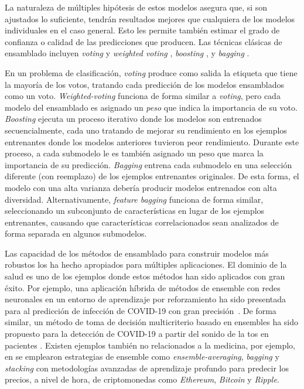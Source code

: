 La naturaleza de múltiples hipótesis de estos modelos asegura que, si son ajustados lo suficiente, tendrán resultados mejores que cualquiera de los modelos individuales en el caso general. Esto les permite también estimar el grado de confianza o calidad de las predicciones que producen. Las técnicas clásicas de ensamblado incluyen \emph{voting} y \textit{weighted voting} \parencite{dietterich2000ensemble}, \emph{boosting} \parencite{schapire1990strength}, y \emph{bagging} \parencite{breiman1996bagging}.

En un problema de clasificación, \emph{voting} produce como salida la etiqueta que tiene la mayoría de los votos, tratando cada predicción de los modelos ensamblados como un voto.
\emph{Weighted-voting} funciona de forma similar a \emph{voting}, pero cada modelo del ensamblado es asignado un \emph{peso} que indica la importancia de su voto.
\emph{Boosting} ejecuta un proceso iterativo donde los modelos son entrenados secuencialmente, cada uno tratando de mejorar su rendimiento en los ejemplos entrenantes donde los modelos anteriores tuvieron peor rendimiento.
Durante este proceso, a cada submodelo le es también asignado un peso que marca la importancia de su predicción.
\textit{Bagging} entrena cada submodelo en una selección diferente (con reemplazo) de los ejemplos entrenantes originales.
De esta forma, el modelo con una alta varianza debería producir modelos entrenados con alta diversidad.
Alternativamente, \textit{feature bagging} funciona de forma similar, seleccionando un subconjunto de características en lugar de los ejemplos entrenantes, causando que características correlacionados sean analizados de forma separada en algunos submodelos.

Las capacidad de los métodos de ensamblado para construir modelos más robustos los ha hecho apropiados para múltiples aplicaciones.
El dominio de la salud es uno de los ejemplos donde estos métodos han sido aplicados con gran éxito.
Por ejemplo, una aplicación híbrida de métodos de ensemble con redes neuronales en un entorno de aprendizaje por reforzamiento ha sido presentada para al predicción de infección de COVID-19 con gran precisión~\parencite{JIN2022105560}.
De forma similar, un método de toma de decisión multicriterio basado en ensembles ha sido propuesto para la detección de COVID-19 a partir del sonido de la tos en pacientes \parencite{CHOWDHURY2022105405}.
Existen ejemplos también no relacionados a la medicina, por ejemplo, en \parencite{livieris2020ensemble} se emplearon estrategias de ensemble como \textit{ensemble-averaging}, \textit{bagging} y \textit{stacking} con metodologías avanzadas de aprendizaje profundo para predecir los precios, a nivel de hora, de criptomonedas como \textit{Ethereum}, \textit{Bitcoin} y \textit{Ripple}.

